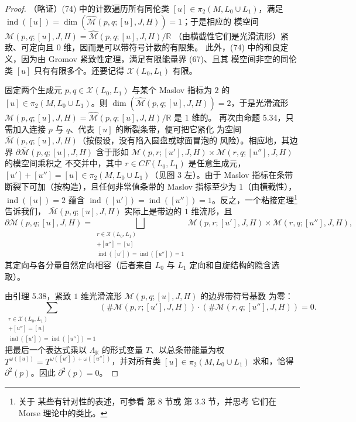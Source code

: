\begin{proof}
（略证）(74) 中的计数遍历所有同伦类
$[u]\in\pi_2(M,L_0\cup L_1)$，满足
$\operatorname{ind}([u])=\dim(\widehat{\mathcal M}(p,q;[u],J,H))=1$；于是相应的
模空间 $\mathcal M(p,q;[u],J,H)=\widehat{\mathcal M}(p,q;[u],J,H)/\mathbb R$
（由横截性它们是光滑流形）紧致、可定向且 $0$ 维，因而是可以带符号计数的有限集。
此外，(74) 中的和良定义，因为由 Gromov 紧致性定理，满足有限能量界 (67)、且其
模空间非空的同伦类 $[u]$ 只有有限多个。还要记得 $\mathcal X(L_0,L_1)$ 有限。

固定两个生成元 $p,q\in\mathcal X(L_0,L_1)$ 与某个 Maslov 指标为 $2$ 的
$[u]\in\pi_2(M,L_0\cup L_1)$。则
$\dim(\widehat{\mathcal M}(p,q;[u],J,H))=2$，于是光滑流形
$\mathcal M(p,q;[u],J,H)=\widehat{\mathcal M}(p,q;[u],J,H)/\mathbb R$ 是 $1$ 维的。
再次由命题 5.34，只需加入连接 $p$ 与 $q$、代表 $[u]$ 的断裂条带，便可把它紧化
为空间 $\overline{\mathcal M}(p,q;[u],J,H)$（按假设，没有陷入圆盘或球面冒泡的
风险）。相应地，其边界 $\partial\overline{\mathcal M}(p,q;[u],J,H)$ 含于形如
$\mathcal M(p,r;[u'],J,H)\times\mathcal M(r,q;[u''],J,H)$ 的模空间乘积之
不交并中，其中 $r\in CF(L_0,L_1)$ 是任意生成元，
$[u']+[u'']=[u]\in\pi_2(M,L_0\cup L_1)$（见图 3 左）。由于 Maslov 指标在条带
断裂下可加（按构造），且任何非常值条带的 Maslov 指标至少为 $1$（由横截性），
$\operatorname{ind}([u])=2$ 蕴含
$\operatorname{ind}([u'])=\operatorname{ind}([u''])=1$。反之，一个粘接定理\footnote{关于
某些有针对性的表述，可参看 \cite{Mer14} 第 8 节或 \cite{Sal97} 第 3.3 节，并思考
它们在 Morse 理论中的类比。}告诉我们，
$\overline{\mathcal M}(p,q;[u],J,H)$ 实际上是带边的 $1$ 维流形，且
\begin{equation}
\partial\overline{\mathcal M}(p,q;[u],J,H)
=\bigsqcup_{\substack{r\in\mathcal X(L_0,L_1)\\
[u']+[u'']=[u]\\
\operatorname{ind}([u'])=\operatorname{ind}([u''])=1}}
\mathcal M(p,r;[u'],J,H)\times\mathcal M(r,q;[u''],J,H),
\label{eq:5.75}
\end{equation}
其定向与各分量自然定向相容（后者来自 $L_0$ 与 $L_1$ 定向和自旋结构的隐含选取）。

由引理 5.38，紧致 $1$ 维光滑流形 $\mathcal M(p,q;[u],J,H)$ 的边界带符号基数
为零：
\[
\sum_{\substack{r\in\mathcal X(L_0,L_1)\\
[u']+[u'']=[u]\\
\operatorname{ind}([u'])=\operatorname{ind}([u''])=1}}
\left(\#\mathcal M(p,r;[u'],J,H)\right)\cdot
\left(\#\mathcal M(r,q;[u''],J,H)\right)=0.
\]
把最后一个表达式乘以 $\Lambda_{\mathbb K}$ 的形式变量 $T$、以总条带能量为权
$T^{\omega([u])}=T^{\omega([u'])+\omega([u''])}$，并对所有类
$[u]\in\pi_2(M,L_0\cup L_1)$ 求和，恰得 $\partial^2(p)$。因此 $\partial^2(p)=0$。


\end{proof}
